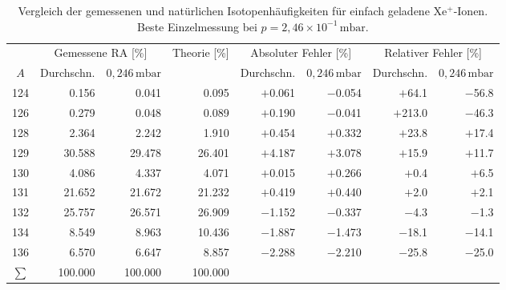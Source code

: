 \documentclass{article}
\begin{document}
\begin{table}[htbp]
    \centering
    \caption{Vergleich der gemessenen und natürlichen Isotopenhäufigkeiten
        für einfach geladene Xe$^+$-Ionen. Beste Einzelmessung bei
        $p = 2{,}46 \times 10^{-1}\,\mathrm{mbar}$.}
    \label{tab:xe1}
    \begin{adjustbox}{max width=\textwidth}
    \begin{tabular}{c r r r r r r r}
        \toprule
        & \multicolumn{2}{c}{Gemessene RA [\%]}
        & {Theorie [\%]}
        & \multicolumn{2}{c}{Absoluter Fehler [\%]}
        & \multicolumn{2}{c}{Relativer Fehler [\%]} \\
        \cmidrule(lr){2-3}\cmidrule(lr){5-6}\cmidrule(lr){7-8}
        $A$ & Durchschn. & $0{,}246\,\mathrm{mbar}$ &
        & Durchschn. & $0{,}246\,\mathrm{mbar}$
        & Durchschn. & $0{,}246\,\mathrm{mbar}$ \\
        \midrule
        124 &  0.156 &  0.041 &  0.095 & $+$0.061 & $-$0.054 &  $+$64.1 &  $-$56.8 \\
        126 &  0.279 &  0.048 &  0.089 & $+$0.190 & $-$0.041 & $+$213.0 &  $-$46.3 \\
        128 &  2.364 &  2.242 &  1.910 & $+$0.454 & $+$0.332 &  $+$23.8 &  $+$17.4 \\
        129 & 30.588 & 29.478 & 26.401 & $+$4.187 & $+$3.078 &  $+$15.9 &  $+$11.7 \\
        130 &  4.086 &  4.337 &  4.071 & $+$0.015 & $+$0.266 &   $+$0.4 &   $+$6.5 \\
        131 & 21.652 & 21.672 & 21.232 & $+$0.419 & $+$0.440 &   $+$2.0 &   $+$2.1 \\
        132 & 25.757 & 26.571 & 26.909 & $-$1.152 & $-$0.337 &   $-$4.3 &   $-$1.3 \\
        134 &  8.549 &  8.963 & 10.436 & $-$1.887 & $-$1.473 &  $-$18.1 &  $-$14.1 \\
        136 &  6.570 &  6.647 &  8.857 & $-$2.288 & $-$2.210 &  $-$25.8 &  $-$25.0 \\
        \midrule
        $\sum$ & 100.000 & 100.000 & 100.000 & & & & \\
        \bottomrule
    \end{tabular}
    \end{adjustbox}
\end{table}
\end{document}
